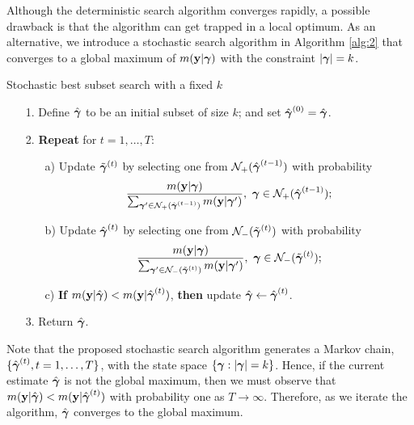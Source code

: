 Although the deterministic search algorithm converges rapidly, a possible drawback is that the algorithm can get trapped in a local optimum. As an alternative, we introduce a stochastic search algorithm in Algorithm \ref{alg:2} that converges to a global maximum of $m({\bf y}|{\boldsymbol \gamma})$ with the constraint $|{\boldsymbol \gamma}|=k$.
\begin{algorithm}[ht!]
\caption{Stochastic best subset search with a fixed $k$}\label{alg:2}
\begin{itemize}\itemsep=0pt
\item[1.] Define $\hat{{\boldsymbol \gamma}}$ to be an initial subset of size $k$; and set $\hat{{\boldsymbol \gamma}}^{(0)}=\hat{{\boldsymbol \gamma}}$.
\item[2.] \textbf{Repeat} for $t=1,\ldots,T$:
\begin{itemize}\itemsep=0pt
\item[a)] Update $\tilde{{\boldsymbol \gamma}}^{(t)}$ by selecting one from $\mathcal{N}_+(\hat{{\boldsymbol \gamma}}^{(t-1)} )$ with probability $$\frac{m({\bf y}|{\boldsymbol \gamma})}{\sum_{{\boldsymbol \gamma}' \in \mathcal{N}_+(\hat{{\boldsymbol \gamma}}^{(t-1)})} m({\bf y}|{\boldsymbol \gamma}')},~{\boldsymbol \gamma} \in \mathcal{N}_+(\hat{{\boldsymbol \gamma}}^{(t-1)} );$$ 
\item[b)] Update $\hat{{\boldsymbol \gamma}}^{(t)}$ by selecting one from $\mathcal{N}_-(\tilde{{\boldsymbol \gamma}}^{(t)} )$ with probability $$\frac{m({\bf y}|{\boldsymbol \gamma})}{\sum_{{\boldsymbol \gamma}' \in \mathcal{N}_-(\tilde{{\boldsymbol \gamma}}^{(t)} ) } m({\bf y}|{\boldsymbol \gamma}')},~{\boldsymbol \gamma} \in \mathcal{N}_-(\tilde{{\boldsymbol \gamma}}^{(t)} ) ;$$
\item[c)] \textbf{If} $m({\bf y}|\hat{{\boldsymbol \gamma}})<m({\bf y}|\hat{{\boldsymbol \gamma}}^{(t)})$, \textbf{then} update $\hat{{\boldsymbol \gamma}}\leftarrow \hat{{\boldsymbol \gamma}}^{(t)}$.
\end{itemize}
\item[3.] Return $\hat{{\boldsymbol \gamma}}$.
\end{itemize}
\end{algorithm}
Note that the proposed stochastic search algorithm generates a Markov chain, $\{\hat{{\boldsymbol \gamma}}^{(t)},t=1,\ldots,T\}$, with the state space $\{{\boldsymbol \gamma}:|{\boldsymbol \gamma}|=k\}$. Hence, if the current estimate $\hat{{\boldsymbol \gamma}}$ is not the global maximum, then we must observe that $m({\bf y}|\hat{{\boldsymbol \gamma}})<m({\bf y}|\hat{{\boldsymbol \gamma}}^{(t)})$ with probability one as $T\to \infty$. Therefore, as we iterate the algorithm, $\hat{{\boldsymbol \gamma}}$ converges to the global maximum.

